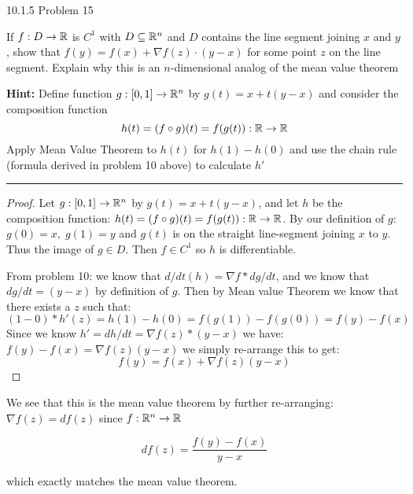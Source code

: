 \documentclass[11pt]{article}
\begin{document}
 10.1.5 Problem 15

If $f: D \to \mathbb{R}$ is $C^1$ with $D \subseteq \mathbb{R}^n$ and $D$ contains the line segment
joining $x$ and $y$, show that $f(y) = f(x) +  \nabla f(z) \cdot (y - x)$ for some
point $z$ on the line segment. Explain why this is an $n$-dimensional
analog of the mean value theorem


\textbf{Hint:} Define function $g : [0, 1] \to \mathbb{R}^n$ by $g(t) = x + t(y - x)$
and consider the composition function 
$$h(t) = (f \circ g)(t) = f(g(t)) : \mathbb{R} \to \mathbb{R}$$
Apply Mean Value Theorem to $h(t)$ for $h(1)- h(0)$ and use the chain rule (formula derived
in problem 10 above) to calculate $h'$
\hrule


\begin{proof}
    
    Let $g : [0, 1] \to \mathbb{R}^n$ by $g(t) = x + t(y - x)$, and let $h$ be the composition
    function: $h(t) = (f \circ g)(t) = f(g(t)) : \mathbb{R} \to \mathbb{R}$.
    By our definition of $g$: $g(0) = x, \; g(1) = y$ and $g(t)$ is on the straight line-segment
    joining $x$ to $y$. Thus the image of $g \in D$. Then $f \in C^1$ so $h$ is differentiable.

    From problem 10: we know that $d/dt (h) = \nabla f * dg/dt$, and we know that $dg/dt = (y-x)$ by definition of $g$.
    Then by Mean value Theorem we know that
    there exists a $z$ such that: $(1-0) * h'(z) = h(1) - h(0) = f(g(1)) - f(g(0)) = f(y) - f(x)$
    Since we know $h' = dh/dt = \nabla f(z) * (y - x)$ we have:
    $f(y) - f(x) = \nabla f(z)(y - x)$ we simply re-arrange this to get:
    $$f(y) = f(x) + \nabla f(z)(y-x)$$
\end{proof}

We see that this is the mean value theorem by further re-arranging: 
$\nabla f(z) = df(z)$ since $f: \mathbb{R} ^n \to \mathbb{R}$

$$df(z) = \frac{f(y) - f(x)}{y-x}$$

which exactly matches the mean value theorem.
\end{document}
